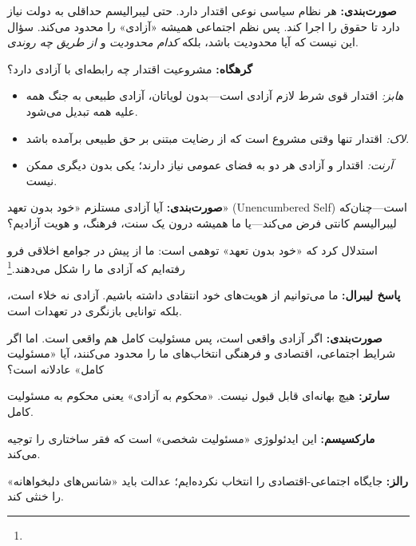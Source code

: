 \begin{tcolorbox}[enemybox, title={تنش ساختاری سوم: آزادی و اقتدار}]

\textbf{صورت‌بندی:} هر نظام سیاسی نوعی اقتدار دارد. حتی لیبرالیسم حداقلی به دولت نیاز دارد تا حقوق را اجرا کند. پس نظم اجتماعی همیشه «آزادی» را محدود می‌کند. سؤال این نیست که آیا محدودیت باشد، بلکه \textit{کدام محدودیت} و \textit{از طریق چه روندی}.

\textbf{گرهگاه:} مشروعیت اقتدار چه رابطه‌ای با آزادی دارد؟
\begin{itemize}[leftmargin=2em]
  \item \textit{هابز:} اقتدار قوی شرط لازم آزادی است—بدون لویاتان، آزادی طبیعی به جنگ همه علیه همه تبدیل می‌شود.
  \item \textit{لاک:} اقتدار تنها وقتی مشروع است که از رضایت مبتنی بر حق طبیعی برآمده باشد.
  \item \textit{آرنت:} اقتدار و آزادی هر دو به فضای عمومی نیاز دارند؛ یکی بدون دیگری ممکن نیست.
\end{itemize}
\end{tcolorbox}

\begin{tcolorbox}[enemybox, title={تنش ساختاری چهارم: آزادی و هویت}]

\textbf{صورت‌بندی:} آیا آزادی مستلزم «خود بدون تعهد» (Unencumbered Self) است—چنان‌که لیبرالیسم کانتی فرض می‌کند—یا ما همیشه درون یک سنت، فرهنگ، و هویت آزادیم؟

 استدلال کرد که «خود بدون تعهد» توهمی است: ما از پیش در جوامع اخلاقی فرو رفته‌ایم که آزادی ما را شکل می‌دهند.\footnote{} %

\textbf{پاسخ لیبرال:} ما می‌توانیم از هویت‌های خود انتقادی داشته باشیم. آزادی نه خلاء است، بلکه توانایی بازنگری در تعهدات است.
\end{tcolorbox}

\begin{tcolorbox}[enemybox, title={تنش ساختاری پنجم: آزادی و مسئولیت}]

\textbf{صورت‌بندی:} اگر آزادی واقعی است، پس مسئولیت کامل هم واقعی است. اما اگر شرایط اجتماعی، اقتصادی و فرهنگی انتخاب‌های ما را محدود می‌کنند، آیا «مسئولیت کامل» عادلانه است؟

\textbf{سارتر:} هیچ بهانه‌ای قابل قبول نیست. «محکوم به آزادی» یعنی محکوم به مسئولیت کامل.

\textbf{مارکسیسم:} این ایدئولوژی «مسئولیت شخصی» است که فقر ساختاری را توجیه می‌کند.

\textbf{رالز:} جایگاه اجتماعی-اقتصادی را انتخاب نکرده‌ایم؛ عدالت باید «شانس‌های دلبخواهانه» را خنثی کند.
\end{tcolorbox}

